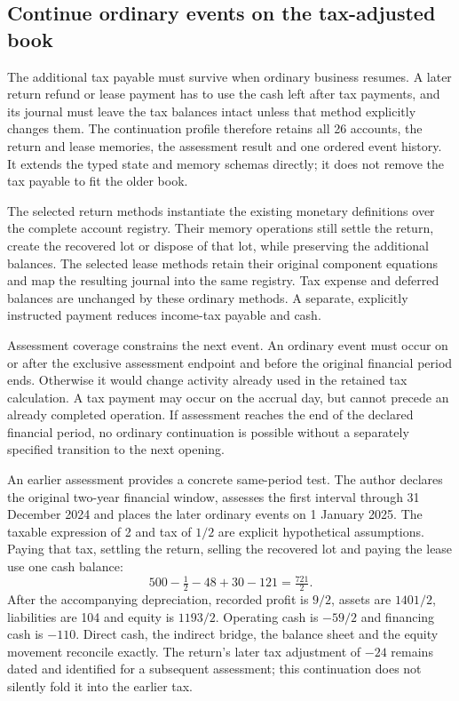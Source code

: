 
\subsection{Continue ordinary events on the tax-adjusted book}

The additional tax payable must survive when ordinary business resumes. A
later return refund or lease payment has to use the cash left after tax
payments, and its journal must leave the tax balances intact unless that
method explicitly changes them. The continuation profile therefore retains
all 26 accounts, the return and lease memories, the assessment result and one
ordered event history. It extends the typed state and memory schemas directly;
it does not remove the tax payable to fit the older book.

The selected return methods instantiate the existing monetary definitions over
the complete account registry. Their memory operations still settle the return,
create the recovered lot or dispose of that lot, while preserving the additional
balances. The selected lease methods retain their original component equations
and map the resulting journal into the same registry. Tax expense and deferred
balances are unchanged by these ordinary methods. A separate, explicitly
instructed payment reduces income-tax payable and cash.

Assessment coverage constrains the next event. An ordinary event must occur on
or after the exclusive assessment endpoint and before the original financial
period ends. Otherwise it would change activity already used in the retained
tax calculation. A tax payment may occur on the accrual day, but cannot precede
an already completed operation. If assessment reaches the end of the declared
financial period, no ordinary continuation is possible without a separately
specified transition to the next opening.

An earlier assessment provides a concrete same-period test. The author declares
the original two-year financial window, assesses the first interval through
31 December 2024 and places the later ordinary events on 1 January 2025.
The taxable expression of 2 and tax of $1/2$ are explicit hypothetical
assumptions. Paying that tax, settling the return, selling the recovered lot
and paying the lease use one cash balance:
\[
 500-\tfrac12-48+30-121=\tfrac{721}{2}.
\]
After the accompanying depreciation, recorded profit is $9/2$, assets are
$1401/2$, liabilities are 104 and equity is $1193/2$. Operating cash is
$-59/2$ and financing cash is $-110$. Direct cash, the indirect bridge,
the balance sheet and the equity movement reconcile exactly. The return's
later tax adjustment of $-24$ remains dated and identified for a subsequent
assessment; this continuation does not silently fold it into the earlier tax.


